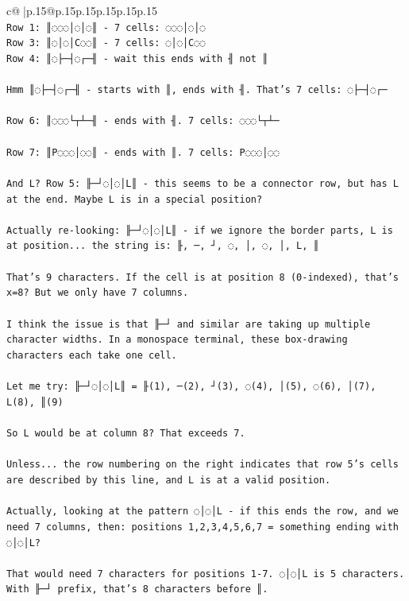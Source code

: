 \documentclass{article}
\begin{document}
{\begin{supertabular}{c@{$\;$}|p{.15\linewidth}@{}p{.15\linewidth}p{.15\linewidth}p{.15\linewidth}p{.15\linewidth}p{.15\linewidth}}
{{{\\ 
\texttt{Row 1: ║◌◌◌│◌│◌║ {-} 7 cells: ◌◌◌│◌│◌} \\
\texttt{Row 3: ║◌│◌│C◌◌║ {-} 7 cells: ◌│◌│C◌◌} \\
\texttt{Row 4: ║◌├─┤◌┌─╢ {-} wait this ends with ╢ not ║} \\
\\ 
\texttt{Hmm ║◌├─┤◌┌─╢ {-} starts with ║, ends with ╢. That's 7 cells: ◌├─┤◌┌─} \\
\\ 
\texttt{Row 6: ║◌◌◌└┬┴─╢ {-} ends with ╢. 7 cells: ◌◌◌└┬┴─} \\
\\ 
\texttt{Row 7: ║P◌◌◌│◌◌║ {-} ends with ║. 7 cells: P◌◌◌│◌◌} \\
\\ 
\texttt{And L? Row 5: ╟─┘◌│◌│L║ {-} this seems to be a connector row, but has L at the end. Maybe L is in a special position?} \\
\\ 
\texttt{Actually re{-}looking: ╟─┘◌│◌│L║ {-} if we ignore the border parts, L is at position... the string is: ╟, ─, ┘, ◌, │, ◌, │, L, ║} \\
\\ 
\texttt{That's 9 characters. If the cell is at position 8 (0{-}indexed), that's x=8? But we only have 7 columns.} \\
\\ 
\texttt{I think the issue is that ╟─┘ and similar are taking up multiple character widths. In a monospace terminal, these box{-}drawing characters each take one cell.} \\
\\ 
\texttt{Let me try: ╟─┘◌│◌│L║ = ╟(1), ─(2), ┘(3), ◌(4), │(5), ◌(6), │(7), L(8), ║(9)} \\
\\ 
\texttt{So L would be at column 8? That exceeds 7.} \\
\\ 
\texttt{Unless... the row numbering on the right indicates that row 5's cells are described by this line, and L is at a valid position.} \\
\\ 
\texttt{Actually, looking at the pattern ◌│◌│L {-} if this ends the row, and we need 7 columns, then: positions 1,2,3,4,5,6,7 = something ending with ◌│◌│L?} \\
\\ 
\texttt{That would need 7 characters for positions 1{-}7. ◌│◌│L is 5 characters. With ╟─┘ prefix, that's 8 characters before ║.} \\
}}}
\end{supertabular}}
\end{document}
